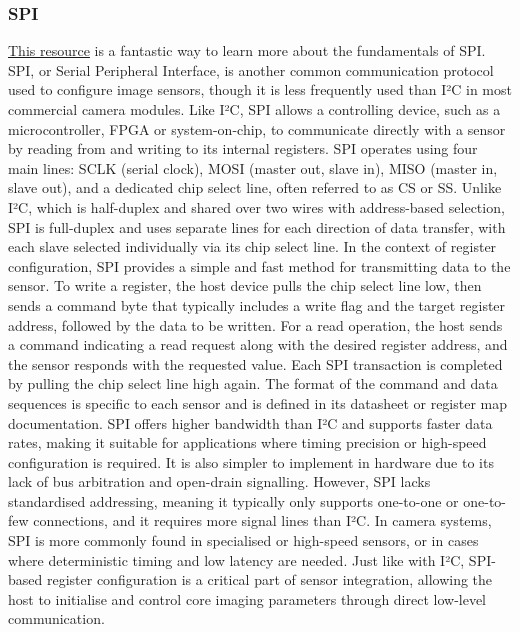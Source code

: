\documentclass[10pt]{article}
\begin{document}
\begin{multicols}{2}
\subsubsection{SPI}
\href{https://www.youtube.com/watch?v=0nVNwozXsIc}{This resource} is a fantastic way to learn more about the fundamentals of SPI.
\newline \newline
SPI, or Serial Peripheral Interface, is another common communication protocol used to configure image sensors, though it is less frequently used than I²C in most commercial camera modules. Like I²C, SPI allows a controlling device, such as a microcontroller, FPGA or system-on-chip, to communicate directly with a sensor by reading from and writing to its internal registers.
SPI operates using four main lines: SCLK (serial clock), MOSI (master out, slave in), MISO (master in, slave out), and a dedicated chip select line, often referred to as CS or SS.
Unlike I²C, which is half-duplex and shared over two wires with address-based selection, SPI is full-duplex and uses separate lines for each direction of data transfer, with each slave selected individually via its chip select line.
\newline \newline
In the context of register configuration, SPI provides a simple and fast method for transmitting data to the sensor. To write a register, the host device pulls the chip select line low, then sends a command byte that typically includes a write flag and the target register address, followed by the data to be written.
For a read operation, the host sends a command indicating a read request along with the desired register address, and the sensor responds with the requested value.
Each SPI transaction is completed by pulling the chip select line high again. The format of the command and data sequences is specific to each sensor and is defined in its datasheet or register map documentation.
\newline \newline
SPI offers higher bandwidth than I²C and supports faster data rates, making it suitable for applications where timing precision or high-speed configuration is required. It is also simpler to implement in hardware due to its lack of bus arbitration and open-drain signalling.
However, SPI lacks standardised addressing, meaning it typically only supports one-to-one or one-to-few connections, and it requires more signal lines than I²C.
In camera systems, SPI is more commonly found in specialised or high-speed sensors, or in cases where deterministic timing and low latency are needed. Just like with I²C, SPI-based register configuration is a critical part of sensor integration, allowing the host to initialise and control core imaging parameters through direct low-level communication.


\end{multicols}
\end{document}
